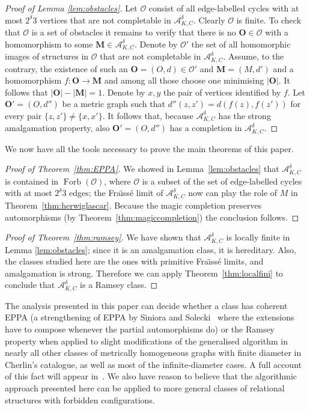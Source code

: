 \documentclass[11pt]{amsart}
\def\Forb{\mathop{\mathrm{Forb}}\nolimits}
\def\str#1{\mathbf {#1}}
\def\Fraisse{Fra\"{\i}ss\' e}
\def\role{role}
\begin{document}
\begin{proof}[Proof of Lemma \ref{lem:obstacles}]
Let $\mathcal O$ consist of all edge-labelled cycles with at most $2^\delta 3$
vertices that are not completable in $\mathcal A^\delta_{K,C}$. Clearly $\mathcal O$ is finite. To check that $\mathcal O$ is a set of obstacles it remains
to verify that there is no $\str{O}\in \mathcal O$ with a homomorphism
to some $\str{M}\in \mathcal A^\delta_{K,C}$. Denote by $\mathcal{O}'$ the set of all homomorphic images
of structures in $\mathcal{O}$ that are not completable in $\mathcal A^\delta_{K,C}$.
Assume, to the contrary, the existence of such an
$\str{O}=(O,d)\in \mathcal{O}'$ and $\str{M}=(M,d')$ and a homomorphism $f\colon \str{O}\to\str{M}$ and among all those choose one minimising 
$\lvert \str{O}\rvert$. It follows that $\lvert \str{O}\rvert-\lvert \str{M}\rvert=1$.
Denote by $x,y$ the pair of vertices identified by $f$. Let $\str{O}'=(O,d'')$  be
a metric graph such that $d''(z,z')=d(f(z),f(z'))$ for every pair $\{z,z'\}\neq \{x,x'\}$.
It follows that, because $\mathcal A^\delta_{K,C}$ has the strong amalgamation property, also
$\str{O}'=(O,d'')$ has a completion in $\mathcal A^\delta_{K,C}$.
\end{proof}
\label{sec:applications}
We now have all the tools necessary to prove the main theorems of this paper.
\begin{proof}[Proof of Theorem~\ref{thm:EPPA}]
We showed in Lemma~\ref{lem:obstacles} that $\mathcal A^\delta_{K,C}$ is contained in $\Forb(\mathcal O)$, where $\mathcal O$ is a subset of the set of edge-labelled cycles with at most $2^\delta3$ edges; the \Fraisse{} limit of $\mathcal A^\delta_{K,C}$ now can play the \role{} of $M$ in Theorem~\ref{thm:herwiglascar}. Because the magic completion preserves automorphisms (by Theorem~\ref{thm:magiccompletion}) the conclusion follows.
\end{proof}
\begin{proof}[Proof of Theorem~\ref{thm:ramsey}]
We have shown that $\mathcal A^\delta_{K,C}$ is locally finite in Lemma \ref{lem:obstacles}; since it is an amalgamation class, it is hereditary. Also, the classes studied here are the ones with primitive \Fraisse{} limits, and amalgamation is strong. Therefore we can apply Theorem~\ref{thm:localfini} to conclude that $\mathcal A^\delta_{K,C}$ is a Ramsey class.
\end{proof}

The analysis presented in this paper can decide whether a class has coherent EPPA (a strengthening of EPPA by Siniora and Solecki~\cite{solecki2009,Siniora} where the extensions have to compose whenever the partial automorphisms do) or the Ramsey property when applied to slight modifications of the generalised algorithm in nearly all other classes of metrically homogeneous graphs with finite diameter in Cherlin's catalogue, as well as most of the infinite-diameter cases. A full account of this fact will appear in~\cite{Aranda2017}. We also have reason to believe that the algorithmic approach presented here can be applied to more general classes of relational structures with forbidden configurations.
\end{document}
